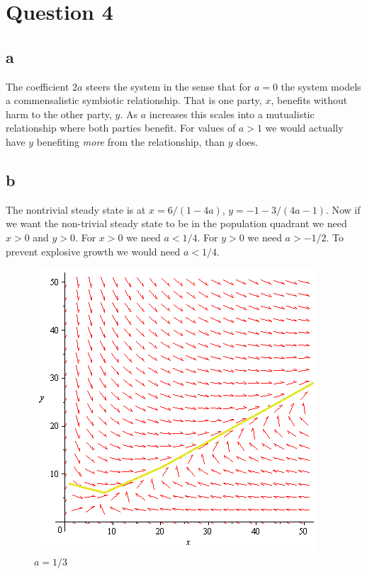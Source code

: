 \documentclass{unswmaths}
\begin{document}
\section*{Question 4}
\subsection*{a}
The coefficient $ 2a $ steers the system in the sense that for $ a = 0 $ the system models a commensalistic symbiotic relationship. That is one party, $ x $, benefits without harm to the other party, $ y $. 
As $ a $ increases this scales into a mutualistic relationship where both parties benefit. For values of $ a > 1 $ we would actually have $ y $ benefiting \emph{more} from the relationship, than $ y $ does. 
\subsection*{b}
The nontrivial steady state is at $ x = 6 / (1 - 4a) $, $ y = -1 - 3 / (4a - 1) $. Now if we want the non-trivial steady state to be in the population quadrant we need $ x > 0 $ and $ y > 0 $.
    For $ x > 0 $ we need $ a < 1 / 4 $. For $ y > 0 $ we need  $ a > -1/2 $.  To prevent explosive growth we would need $ a < 1/4 $.
\begin{figure}[H]
    \includegraphics[scale=0.3]{dir_field_1_3}
    \caption{$ a= 1 / 3 $}
\end{figure}
\end{document}

